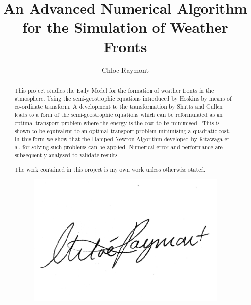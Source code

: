 \documentclass[a4paper, 12pt, twoside]{report}
\title{An Advanced Numerical Algorithm for the Simulation of Weather Fronts}
\author{Chloe Raymont}
\theoremstyle{definition}
\begin{document}

\onehalfspacing
\begin{abstract}
This project studies the Eady Model for the formation of weather fronts in the atmosphere. Using the semi-geostrophic equations introduced by Hoskins \cite{Hoskins1975} by means of co-ordinate transform. A development to the transformation by Shutts and Cullen \cite{Shutts1987} leads to a form of the semi-geostrophic equations which can be reformulated as an optimal transport problem where the energy is the cost to be minimised \cite{Cullen2006a}. This is shown to be equivalent to an optimal transport problem minimising a quadratic cost. In this form we show that the Damped Newton Algorithm developed by Kitawaga et al. \cite{Kitagawa2016,Merigot2017a} for solving such problems can be applied. Numerical error and performance are subsequently analysed to validate results.
\end{abstract}

\renewcommand{\abstractname}{Acknowledgements}
\begin{abstract}

\end{abstract}
\renewcommand{\abstractname}{Declaration}
\begin{abstract}
	The work contained in this project is my own work unless otherwise stated.
	\begin{figure}[h]
		\centering
		\includegraphics[width=0.7\linewidth]{ChloeRaymont_esignature}
	\end{figure}
	
\end{abstract}

\tableofcontents
\listoffigures









\end{document}

